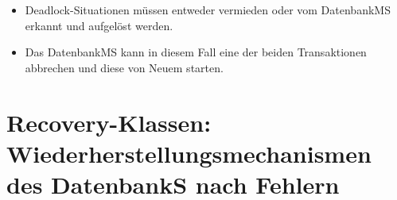 \documentclass{lehramt-informatik-haupt}
\begin{document}
\begin{itemize}
\item Deadlock-Situationen müssen entweder vermieden oder vom DatenbankMS
erkannt und aufgelöst werden.

\item Das DatenbankMS kann in diesem Fall eine der beiden Transaktionen
abbrechen und diese von Neuem starten.
\end{itemize}

%

\section{Recovery-Klassen: Wiederherstellungsmechanismen des DatenbankS nach
Fehlern}
\end{document}
